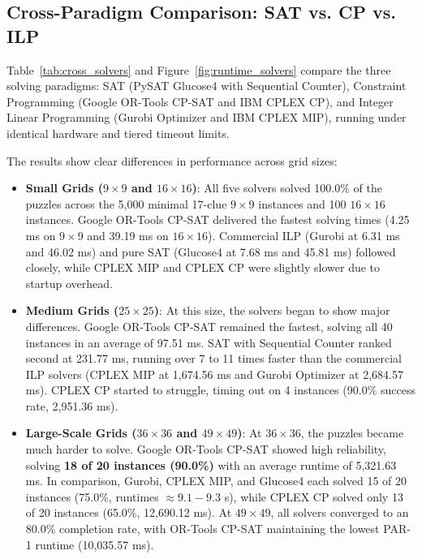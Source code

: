\documentclass[a4paper,fleqn]{cas-sc}
\begin{document}
\clearpage
\subsection{Cross-Paradigm Comparison: SAT vs. CP vs. ILP}
Table~\ref{tab:cross_solvers} and Figure~\ref{fig:runtime_solvers} compare the three solving paradigms: SAT (PySAT Glucose4 with Sequential Counter), Constraint Programming (Google OR-Tools CP-SAT and IBM CPLEX CP), and Integer Linear Programming (Gurobi Optimizer and IBM CPLEX MIP), running under identical hardware and tiered timeout limits.

The results show clear differences in performance across grid sizes:
\begin{itemize}
    \item \textbf{Small Grids ($9 \times 9$ and $16 \times 16$)}: All five solvers solved 100.0\% of the puzzles across the 5,000 minimal 17-clue $9 \times 9$ instances and 100 $16 \times 16$ instances. Google OR-Tools CP-SAT delivered the fastest solving times (4.25 ms on $9 \times 9$ and 39.19 ms on $16 \times 16$). Commercial ILP (Gurobi at 6.31 ms and 46.02 ms) and pure SAT (Glucose4 at 7.68 ms and 45.81 ms) followed closely, while CPLEX MIP and CPLEX CP were slightly slower due to startup overhead.
    
    \item \textbf{Medium Grids ($25 \times 25$)}: At this size, the solvers began to show major differences. Google OR-Tools CP-SAT remained the fastest, solving all 40 instances in an average of 97.51 ms. SAT with Sequential Counter ranked second at 231.77 ms, running over 7 to 11 times faster than the commercial ILP solvers (CPLEX MIP at 1,674.56 ms and Gurobi Optimizer at 2,684.57 ms). CPLEX CP started to struggle, timing out on 4 instances (90.0\% success rate, 2,951.36 ms).
    
    \item \textbf{Large-Scale Grids ($36 \times 36$ and $49 \times 49$)}: At $36 \times 36$, the puzzles became much harder to solve. Google OR-Tools CP-SAT showed high reliability, solving \textbf{18 of 20 instances (90.0\%)} with an average runtime of 5,321.63 ms. In comparison, Gurobi, CPLEX MIP, and Glucose4 each solved 15 of 20 instances (75.0\%, runtimes $\approx 9.1 - 9.3$ s), while CPLEX CP solved only 13 of 20 instances (65.0\%, 12,690.12 ms). At $49 \times 49$, all solvers converged to an 80.0\% completion rate, with OR-Tools CP-SAT maintaining the lowest PAR-1 runtime (10,035.57 ms).
\end{itemize}
\end{document}
